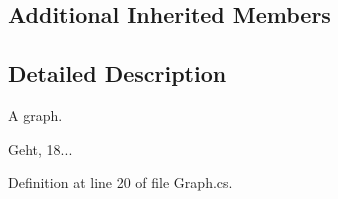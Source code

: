 \subsection*{Additional Inherited Members}


\subsection{Detailed Description}
A graph. 

Geht, 18... 

Definition at line 20 of file Graph.\-cs.

